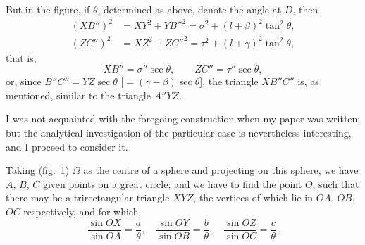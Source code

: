 \documentclass[11pt,a4paper]{book}
\begin{document}
But in the figure, if $\theta$, determined as above, denote the angle at $D$, then
\begin{align*}
(XB'')^2 &= XY^2 + YB''^2 = \sigma^2 + (l+\beta)^2\tan^2\theta,\\
(ZC'')^2 &= XZ^2 + ZC''^2 = \tau^2 + (l+\gamma)^2\tan^2\theta,
\end{align*}
that is,
\[
XB'' = \sigma''\sec\theta,\qquad ZC'' = \tau''\sec\theta,
\]
or, since $B''C'' = YZ\sec\theta$ [$= (\gamma-\beta)\sec\theta$], the triangle $XB''C''$ is, as mentioned, similar to the triangle $A''YZ$.

I was not acquainted with the foregoing construction when my paper was written; but the analytical investigation of the particular case is nevertheless interesting, and I proceed to consider it.

Taking (fig.~1) $\Omega$ as the centre of a sphere and projecting on this sphere, we have $A$, $B$, $C$ given points on a great circle; and we have to find the point $O$, such that there may be a trirectangular triangle $XYZ$, the vertices of which lie in $OA$, $OB$, $OC$ respectively, and for which
\[
\frac{\sin OX}{\sin OA} = \frac{a}{\theta},\quad \frac{\sin OY}{\sin OB} = \frac{b}{\theta},\quad \frac{\sin OZ}{\sin OC} = \frac{c}{\theta}.
\]
\end{document}
